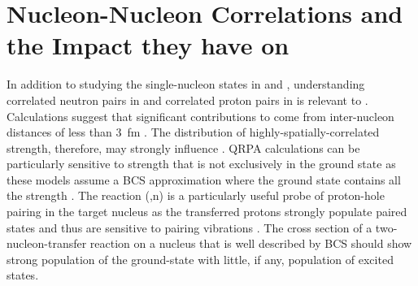 \section{Nucleon-Nucleon Correlations and the Impact they have on \NME}
\label{sec:correlations}

In addition to studying the single-nucleon states in \GeTargets and \SeProducts, understanding correlated neutron pairs in  and correlated proton pairs in  is relevant to \NME.  Calculations suggest that significant contributions to \NME come from inter-nucleon distances of less than 3~fm \citep{anatomy}.  The distribution of highly-spatially-correlated \zp strength, therefore, may strongly influence \NME.  QRPA calculations can be particularly sensitive to \zp strength that is not exclusively in the ground state as these models assume a BCS approximation where the ground state contains all the \zp strength \citep{BenderSCMF}.  The reaction (,n) is a particularly useful probe of proton-hole pairing in the target nucleus as the transferred protons strongly populate paired states and thus are sensitive to pairing vibrations \citep{Yoshida}.  The cross section of a two-nucleon-transfer reaction on a nucleus that is well described by BCS should show strong population of the \zp ground-state with little, if any, population of \zp excited states.   

